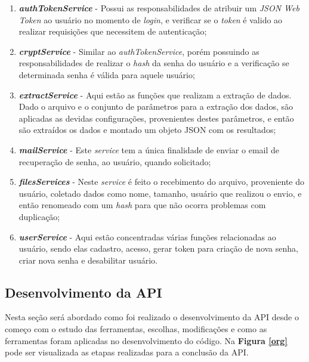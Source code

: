 \begin{enumerate}
    \item \textbf{\textit{authTokenService}} -
    Possui as responsabilidades de atribuir um \textit{JSON Web Token} ao usuário no momento de \textit{login}, e verificar se o \textit{token} é valido ao realizar requisições que necessitem de autenticação;
    
    \item \textbf{\textit{cryptService}} -
    Similar ao \textit{authTokenService}, porém possuindo as responsabilidades de realizar o \textit{hash} da senha do usuário e a verificação se determinada senha é válida para aquele usuário;
    
    \item \textbf{\textit{extractService}} -
    Aqui estão as funções que realizam a extração de dados. Dado o arquivo e o conjunto de parâmetros para a extração dos dados, são aplicadas as devidas configurações, provenientes destes parâmetros, e então são extraídos os dados e montado um objeto JSON com os resultados;
    
    \item \textbf{\textit{mailService}} -
    Este \textit{service} tem a única finalidade de enviar o email de recuperação de senha, ao usuário, quando solicitado;
    
    \item \textbf{\textit{filesServices}} -
    Neste \textit{service} é feito o recebimento do arquivo, proveniente do usuário, coletado dados como nome, tamanho, usuário que realizou o envio, e então renomeado com um \textit{hash} para que não ocorra problemas com duplicação;
    
    \item \textbf{\textit{userService}} -
    Aqui estão concentradas várias funções relacionadas ao usuário, sendo elas cadastro, acesso, gerar token para criação de nova senha, criar nova senha e desabilitar usuário.
\end{enumerate}
    
\subsection{Desenvolvimento da API} \label{apiDev}

Nesta seção será abordado como foi realizado o desenvolvimento da API desde o começo com o estudo das ferramentas, escolhas, modificações e como as ferramentas foram aplicadas no desenvolvimento do código. Na \textbf{Figura \ref{org}} pode ser visualizada as etapas realizadas para a conclusão da API.

